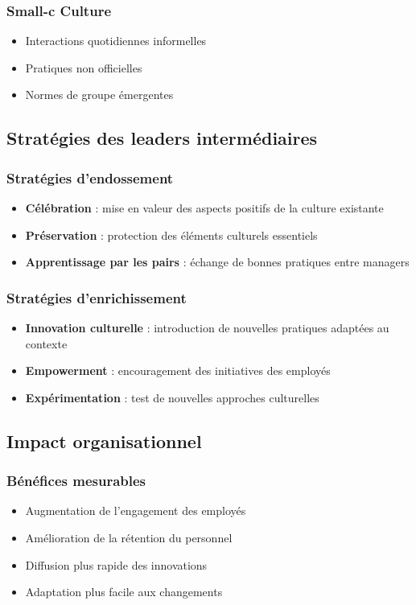 \documentclass[12pt,a4paper]{article}
\begin{document}
\subsubsection{Small-c Culture}
\begin{itemize}
    \item Interactions quotidiennes informelles
    \item Pratiques non officielles
    \item Normes de groupe émergentes
\end{itemize}

\subsection{Stratégies des leaders intermédiaires}

\subsubsection{Stratégies d'endossement}
\begin{itemize}
    \item \textbf{Célébration} : mise en valeur des aspects positifs de la culture existante
    \item \textbf{Préservation} : protection des éléments culturels essentiels
    \item \textbf{Apprentissage par les pairs} : échange de bonnes pratiques entre managers
\end{itemize}

\subsubsection{Stratégies d'enrichissement}
\begin{itemize}
    \item \textbf{Innovation culturelle} : introduction de nouvelles pratiques adaptées au contexte
    \item \textbf{Empowerment} : encouragement des initiatives des employés
    \item \textbf{Expérimentation} : test de nouvelles approches culturelles
\end{itemize}

\subsection{Impact organisationnel}

\subsubsection{Bénéfices mesurables}
\begin{itemize}
    \item Augmentation de l'engagement des employés
    \item Amélioration de la rétention du personnel
    \item Diffusion plus rapide des innovations
    \item Adaptation plus facile aux changements
\end{itemize}
\end{document}
